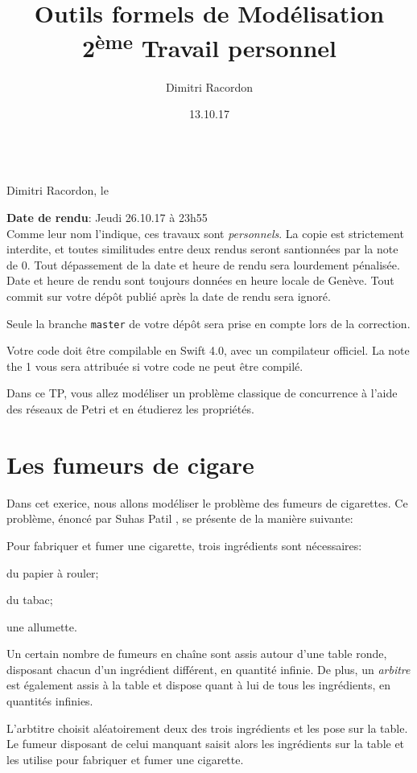 \documentclass[a4paper, titlepage]{article}
\makeatletter
\numberwithin{figure}{section}
\numberwithin{table}{section}
\newcommand\deadline[1]{\def\@deadline{#1}}
\newcommand\objective[1]{\def\@objective{#1}}
\newcommand{\makecustomtitle}{%
	\begin{center}
		\huge\@title \\
		[1ex]\small Dimitri Racordon, le \@date
	\end{center}
	\begin{framed}\@deadline\end{framed}
	\begin{framed}\@objective\end{framed}
}
\makeatother
\begin{document}
\title{Outils formels de Modélisation \\ 2\textsuperscript{ème} Travail personnel}
\author{Dimitri Racordon}
\date{13.10.17}

\deadline{
\textbf{Date de rendu}: Jeudi 26.10.17 à 23h55 \\

  Comme leur nom l'indique, ces travaux sont \emph{personnels}.
  La copie est strictement interdite, et toutes similitudes entre deux rendus
  seront santionnées par la note de 0.
  Tout dépassement de la date et heure de rendu sera lourdement pénalisée.
  Date et heure de rendu sont toujours données en heure locale de Genève.
  Tout commit sur votre dépôt publié après la date de rendu sera ignoré.

  Seule la branche \texttt{master} de votre dépôt sera prise en compte
  lors de la correction.

  Votre code doit être compilable en Swift 4.0, avec un compilateur officiel.
  La note the 1 vous sera attribuée si votre code ne peut être compilé.
}

\objective{
  Dans ce TP, vous allez modéliser un problème classique de concurrence
  à l’aide des réseaux de Petri et en étudierez les propriétés.
}

\makecustomtitle

\section{Les fumeurs de cigare}

Dans cet exerice, nous allons modéliser le problème des fumeurs de cigarettes.
Ce problème, énoncé par Suhas Patil \cite{patil:1971}, se présente de la manière suivante:

Pour fabriquer et fumer une cigarette, trois ingrédients sont nécessaires:
\begin{inparaenum}[\itshape 1\upshape)]
  \item du papier à rouler;
  \item du tabac;
  \item une allumette.
\end{inparaenum}
Un certain nombre de fumeurs en chaîne sont assis autour d'une table ronde,
disposant chacun d'un ingrédient différent,
en quantité infinie.
De plus, un \emph{arbitre} est également assis à la table
et dispose quant à lui de tous les ingrédients, en quantités infinies.

L'arbtitre choisit aléatoirement deux des trois ingrédients et les pose sur la table.
Le fumeur disposant de celui manquant saisit alors les ingrédients sur la table
et les utilise pour fabriquer et fumer une cigarette.
\end{document}
